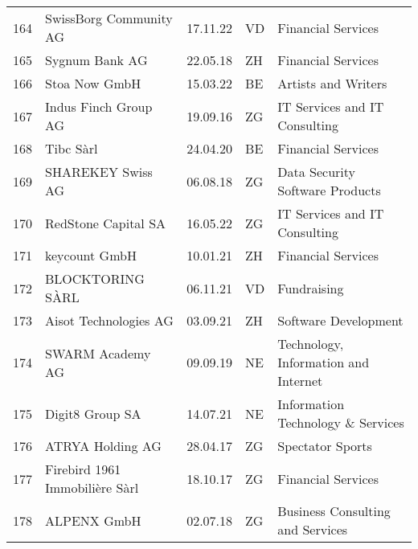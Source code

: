 \begin{tabular}{lllll}
164 &                             SwissBorg Community AG &      17.11.22 &     VD &                             Financial Services \\
165 &                                     Sygnum Bank AG &      22.05.18 &     ZH &                             Financial Services \\
166 &                                      Stoa Now GmbH &      15.03.22 &     BE &                            Artists and Writers \\
167 &                               Indus Finch Group AG &      19.09.16 &     ZG &                  IT Services and IT Consulting \\
168 &                                          Tibc Sàrl &      24.04.20 &     BE &                             Financial Services \\
169 &                                  SHAREKEY Swiss AG &      06.08.18 &     ZG &                Data Security Software Products \\
170 &                                RedStone Capital SA &      16.05.22 &     ZG &                  IT Services and IT Consulting \\
171 &                                      keycount GmbH &      10.01.21 &     ZH &                             Financial Services \\
172 &                                   BLOCKTORING SÀRL &      06.11.21 &     VD &                                    Fundraising \\
173 &                              Aisot Technologies AG &      03.09.21 &     ZH &                           Software Development \\
174 &                                   SWARM Academy AG &      09.09.19 &     NE &           Technology, Information and Internet \\
175 &                                    Digit8 Group SA &      14.07.21 &     NE &              Information Technology \& Services \\
176 &                                   ATRYA Holding AG &      28.04.17 &     ZG &                               Spectator Sports \\
177 &                     Firebird 1961 Immobilière Sàrl &      18.10.17 &     ZG &                             Financial Services \\
178 &                                        ALPENX GmbH &      02.07.18 &     ZG &               Business Consulting and Services \\

\end{tabular}
